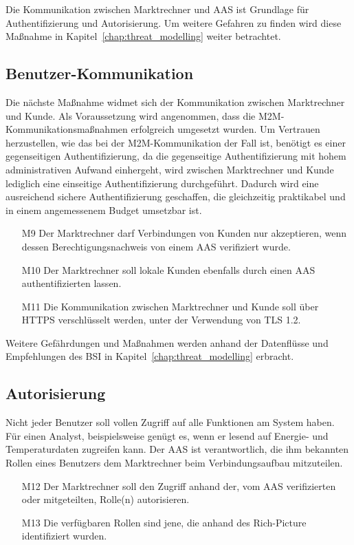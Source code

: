 \documentclass[11pt,a4paper]{report}
\begin{document}
Die Kommunikation zwischen Marktrechner und AAS ist Grundlage für Authentifizierung und Autorisierung. Um weitere Gefahren zu finden wird diese Maßnahme in  Kapitel~\ref{chap:threat_modelling} weiter betrachtet.

\subsection{Benutzer-Kommunikation} 
Die nächste Maßnahme widmet sich der Kommunikation zwischen Marktrechner und Kunde. Als Voraussetzung wird angenommen, dass die M2M-Kommunikations\-maßnahmen erfolgreich umgesetzt wurden. Um Vertrauen herzustellen, wie das bei der M2M-Kommunikation der Fall ist, benötigt es einer gegenseitigen Authentifizierung, da die gegenseitige Authentifizierung mit hohem administrativen Aufwand einhergeht, wird zwischen Marktrechner und Kunde lediglich eine einseitige Authentifizierung durchgeführt. Dadurch wird eine ausreichend sichere Authentifizierung geschaffen, die gleichzeitig praktikabel und in einem angemessenem Budget umsetzbar ist.

\begin{enumerate}
\item[M9] Der Marktrechner darf Verbindungen von Kunden nur akzeptieren, wenn dessen Berechtigungsnachweis von einem AAS verifiziert wurde.
\item[M10] Der Marktrechner soll lokale Kunden ebenfalls durch einen AAS authentifizierten lassen.
\item[M11] Die Kommunikation zwischen Marktrechner und Kunde soll über HTTPS verschlüsselt werden, unter der Verwendung von TLS 1.2.
\end{enumerate}

Weitere Gefährdungen und Maßnahmen werden anhand der Datenflüsse und Empfehlungen des BSI in Kapitel~\ref{chap:threat_modelling} erbracht.

\subsection{Autorisierung}
Nicht jeder Benutzer soll vollen Zugriff auf alle Funktionen am System haben. Für einen Analyst, beispielsweise genügt es, wenn er lesend auf Energie- und Temperaturdaten zugreifen kann. Der AAS ist verantwortlich, die ihm bekannten Rollen eines Benutzers dem Marktrechner beim Verbindungsaufbau mitzuteilen.

\begin{enumerate}
\item[M12] Der Marktrechner soll den Zugriff anhand der, vom AAS verifizierten oder mitgeteilten, Rolle(n) autorisieren.
\item[M13] Die verfügbaren Rollen sind jene, die anhand des Rich-Picture identifiziert wurden.
\end{enumerate}
\end{document}

